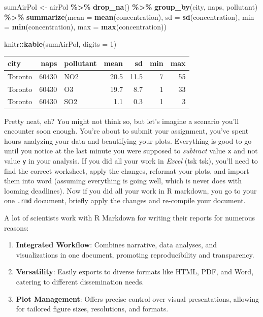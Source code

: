 \documentclass[
]{book}
\newenvironment{Shaded}{\begin{snugshade}}{\end{snugshade}}
\newcommand{\AttributeTok}[1]{\textcolor[rgb]{0.13,0.29,0.53}{#1}}
\newcommand{\DecValTok}[1]{\textcolor[rgb]{0.00,0.00,0.81}{#1}}
\newcommand{\FunctionTok}[1]{\textcolor[rgb]{0.13,0.29,0.53}{\textbf{#1}}}
\newcommand{\NormalTok}[1]{#1}
\newcommand{\OtherTok}[1]{\textcolor[rgb]{0.56,0.35,0.01}{#1}}
\newcommand{\SpecialCharTok}[1]{\textcolor[rgb]{0.81,0.36,0.00}{\textbf{#1}}}
\providecommand{\tightlist}{%
  \setlength{\itemsep}{0pt}\setlength{\parskip}{0pt}}
\begin{document}
\begin{Shaded}
\begin{Highlighting}[]
\NormalTok{sumAirPol }\OtherTok{\textless{}{-}}\NormalTok{ airPol }\SpecialCharTok{\%\textgreater{}\%}
  \FunctionTok{drop\_na}\NormalTok{() }\SpecialCharTok{\%\textgreater{}\%}
  \FunctionTok{group\_by}\NormalTok{(city, naps, pollutant) }\SpecialCharTok{\%\textgreater{}\%}
  \FunctionTok{summarize}\NormalTok{(}\AttributeTok{mean =} \FunctionTok{mean}\NormalTok{(concentration), }
            \AttributeTok{sd =} \FunctionTok{sd}\NormalTok{(concentration), }
            \AttributeTok{min =} \FunctionTok{min}\NormalTok{(concentration), }
            \AttributeTok{max =} \FunctionTok{max}\NormalTok{(concentration))}

\NormalTok{knitr}\SpecialCharTok{::}\FunctionTok{kable}\NormalTok{(sumAirPol, }\AttributeTok{digits =} \DecValTok{1}\NormalTok{)}
\end{Highlighting}
\end{Shaded}

\begin{tabular}{l|r|l|r|r|r|r}
\hline
city & naps & pollutant & mean & sd & min & max\\
\hline
Toronto & 60430 & NO2 & 20.5 & 11.5 & 7 & 55\\
\hline
Toronto & 60430 & O3 & 19.7 & 8.7 & 1 & 33\\
\hline
Toronto & 60430 & SO2 & 1.1 & 0.3 & 1 & 3\\
\hline
\end{tabular}

Pretty neat, eh? You might not think so, but let's imagine a scenario you'll encounter soon enough. You're about to submit your assignment, you've spent hours analyzing your data and beautifying your plots. Everything is good to go until you notice at the last minute you were supposed to \emph{subtract} value \texttt{x} and not value \texttt{y} in your analysis. If you did all your work in \emph{Excel} (tsk tsk), you'll need to find the correct worksheet, apply the changes, reformat your plots, and import them into word (assuming everything is going well, which is never does with looming deadlines). Now if you did all your work in R markdown, you go to your one \texttt{.rmd} document, briefly apply the changes and re-compile your document.

A lot of scientists work with R Markdown for writing their reports for numerous reasons:

\begin{enumerate}
\def\labelenumi{\arabic{enumi}.}
\tightlist
\item
  \textbf{Integrated Workflow}: Combines narrative, data analyses, and visualizations in one document, promoting reproducibility and transparency.
\item
  \textbf{Versatility}: Easily exports to diverse formats like HTML, PDF, and Word, catering to different dissemination needs.
\item
  \textbf{Plot Management}: Offers precise control over visual presentations, allowing for tailored figure sizes, resolutions, and formats.
\end{enumerate}
\end{document}

